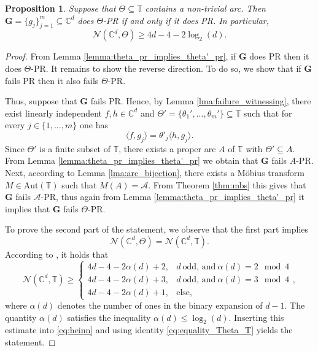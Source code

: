 \documentclass[reqno,a4paper,11pt]{amsart}
\numberwithin{equation}{section}
\newtheorem{proposition}[definition]{Proposition}
\def\T{{\mathbb T}}
\def\C{{\mathbb C}}
\newcommand{\Cd}{{\C^d}}
\newcommand\1{\mathds{1}}
\begin{document}
\begin{proposition}
Suppose that $\Theta \subseteq \T$ contains a non-trivial arc. Then $\mathbf{G}=\{ g_j \}_{j=1}^m \subseteq \Cd$ does $\Theta$-PR if and only if it does PR. In particular,
$$
\mathcal{N}(\C^d,\Theta) \geq 4d -4 - 2\log_2(d).
$$
\end{proposition}
\begin{proof}
    From Lemma \ref{lemma:theta_pr_implies_theta'_pr}, if $\mathbf{G}$ does PR then it does $\Theta$-PR. It remains to show the reverse direction. To do so, we show that if $\mathbf{G}$ fails PR then it also fails $\Theta$-PR.

    Thus, suppose that $\mathbf{G}$ fails PR. Hence, by Lemma \ref{lma:failure_witnessing}, there exist linearly independent $f,h\in \C^d$ and $\Theta'=\{\theta_1',...,\theta_m'\}\subseteq \T$ such that for every $j \in \{1, \dots, m \}$ one has
    $$\langle f,g_j\rangle = \theta'_j \langle h,g_j\rangle.$$   
    Since $\Theta'$ is a finite subset of $\T$, there exists a proper arc $A$ of $\T$ with $\Theta'\subseteq A$. From Lemma \ref{lemma:theta_pr_implies_theta'_pr} we obtain that $\mathbf{G}$ fails $A$-PR. Next, according to Lemma \ref{lma:arc_bijection}, there exists a Möbius transform $M \in \mathrm{Aut}(\T)$ such that $M(A)=\mathcal{A}$. From Theorem \ref{thm:mbs} this gives that $\mathbf{G}$ fails $\mathcal{A}$-PR, thus again from Lemma \ref{lemma:theta_pr_implies_theta'_pr} it implies that $\mathbf{G}$ fails $\Theta$-PR.

    To prove the second part of the statement, we observe that the first part implies 
    \begin{equation}\label{eq:equality_Theta_T}
        \mathcal{N}(\C^d,\Theta)  = \mathcal{N}(\C^d,\T).
    \end{equation}
    According to \cite{heinosaari2013quantum}, it holds that
    \begin{equation}\label{eq:heinn}
        \mathcal{N}(\C^d,\T) \geq \begin{cases}
            4d-4-2\alpha(d) + 2, & d \ \text{odd, and} \ \alpha(d) = 2 \mod 4 \\
            4d-4-2\alpha(d) + 3, & d \ \text{odd, and} \ \alpha(d) = 3 \mod 4 \\
            4d-4-2\alpha(d) + 1, & \text{else},
        \end{cases},
    \end{equation}
    where $\alpha(d)$ denotes the number of ones in the binary expansion of $d-1$. The quantity $\alpha(d)$ satisfies the inequality $\alpha(d) \leq \log_2(d)$. Inserting this estimate into \eqref{eq:heinn} and using identity \eqref{eq:equality_Theta_T} yields the statement.
    
\end{proof}
\end{document}
